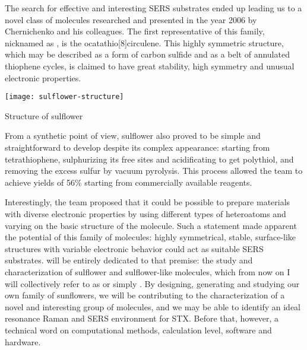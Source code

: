 The search for effective and interesting SERS substrates ended up leading us to a novel class of molecules researched and presented in the year 2006 by Chernichenko and his colleagues.
The first representative of this family, nicknamed as , is the ocatathio[8]circulene.
This highly symmetric structure, which may be described as a form of carbon sulfide and as a belt of annulated thiophene cycles, is claimed to have great stability, high symmetry and unusual electronic properties.

\begin{marginfigure}
    \texttt{[image: sulflower-structure]}
    \caption[Structure of sulflower]{Structure of sulflower}
\end{marginfigure}


From a synthetic point of view, sulflower also proved to be simple and straightforward to develop despite its complex appearance: starting from tetrathiophene, sulphurizing its free sites and acidificating to get polythiol, and removing the excess sulfur by vacuum pyrolysis.
This process allowed the team to achieve yields of 56\% starting from commercially available reagents.

Interestingly, the team proposed that it could be possible to prepare materials with diverse electronic properties by using different types of heteroatoms and varying on the basic structure of the molecule.
Such a statement made apparent the potential of this family of molecules: highly symmetrical, stable, surface-like structures with variable electronic behavior could act as suitable SERS substrates.
 will be entirely dedicated to that premise: the study and characterization of sulflower and sulflower-like molecules, which from now on I will collectively refer to as  or simply .
By designing, generating and studying our own family of sunflowers, we will be contributing to the characterization of a novel and interesting group of molecules, and we may be able to identify an ideal resonance Raman and SERS environment for STX.
Before that, however, a technical word on computational methods, calculation level, software and hardware.

